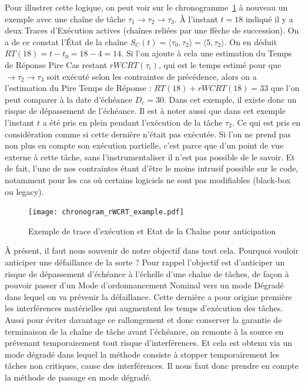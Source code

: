 \documentclass[french, a4paper, 11pt, twoside, pdftex]{StyleThese}
\begin{document}
	Pour illustrer cette logique, on peut voir sur le chronogramme~\ref{fig:chronogram_rWCRT_example} à nouveau un exemple avec une chaîne de tâche $\tau_1 \rightarrow \tau_2 \rightarrow \tau_3$. À l'instant $t=18$ indiqué il y a deux Traces d'Exécution actives (chaînes reliées par une flèche de succession). On a de ce constat l'État de la chaîne $S_C(t) = \langle \tau_0, \tau_2\rangle = \langle 5, \tau_{2} \rangle $.
	On en déduit $ RT(18) = t - t_0 = 18-4 = 14 $. Si l'on ajoute à cela une estimation du Temps de Réponse Pire Cas restant $rWCRT(\tau_i)$, qui est le temps estimé pour que $\rightarrow \tau_2 \rightarrow \tau_3$ soit exécuté selon les contraintes de précédence, alors on a l'estimation du Pire Temps de Réponse : $ RT(18) + rWCRT(18) = 33$ que l'on peut comparer à la date d'échéance $ D_c = 30 $. Dans cet exemple, il existe donc un risque de dépassement de l'échéance.
	Il est à noter aussi que dans cet exemple l'instant $t$ a été pris en plein pendant l'exécution de la tâche $ \tau_2 $. Ce qui est pris en considération comme si cette dernière n'était pas exécutée. Si l'on ne prend pas non plus en compte son exécution partielle, c'est parce que d'un point de vue externe à cette tâche, sans l'instrumentaliser il n'est pas possible de le savoir. Et de fait, l'une de nos contraintes étant d'être le moins intrusif possible sur le code, notamment pour les cas où certains logiciels ne sont pas modifiables (black-box ou legacy). 
	
    \begin{figure}[ht]
		\centering 
		\texttt{[image: chronogram\_rWCRT\_example.pdf]}
		\caption{Exemple de trace d'exécution et Etat de la Chaîne pour anticipation}
		\label{fig:chronogram_rWCRT_example}
	\end{figure}

	À présent, il faut nous souvenir de notre objectif dans tout cela. Pourquoi vouloir anticiper une défaillance de la sorte ? Pour rappel l'objectif est d'anticiper un risque de dépassement d'échéance à l'échelle d'une chaîne de tâches, de façon à pouvoir passer d'un Mode d'ordonnancement Nominal vers un mode Dégradé dans lequel on va prévenir la défaillance. Cette dernière a pour origine première les interférences matérielles qui augmentent les temps d'exécution des tâches. Aussi pour éviter davantage ce rallongement et donc conserver la garantie de terminaison de la chaîne de tâche avant l'échéance, on remonte à la source en prévenant temporairement tout risque d'interférences. Et cela est obtenu via un mode dégradé dans lequel la méthode consiste à stopper temporairement les tâches non critiques, cause des interférences.
	Il nous faut donc prendre en compte la méthode de passage en mode dégradé. 
	
\end{document}
